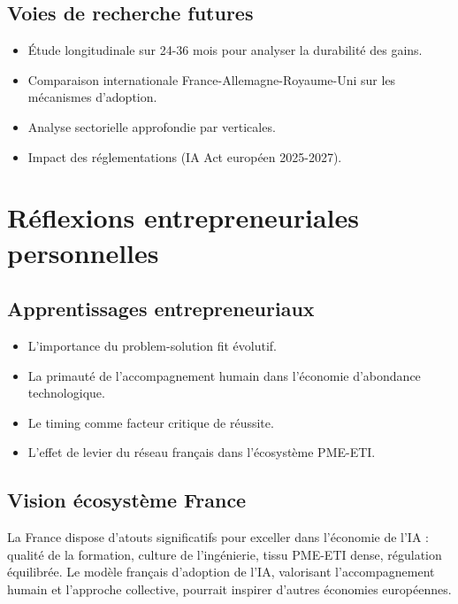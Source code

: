 \subsection{Voies de recherche futures}
\begin{itemize}
    \item Étude longitudinale sur 24-36 mois pour analyser la durabilité des gains.
    \item Comparaison internationale France-Allemagne-Royaume-Uni sur les mécanismes d'adoption.
    \item Analyse sectorielle approfondie par verticales.
    \item Impact des réglementations (IA Act européen 2025-2027).
\end{itemize}

\section{Réflexions entrepreneuriales personnelles}

\subsection{Apprentissages entrepreneuriaux}
\begin{itemize}
    \item L'importance du problem-solution fit évolutif.
    \item La primauté de l'accompagnement humain dans l'économie d'abondance technologique.
    \item Le timing comme facteur critique de réussite.
    \item L'effet de levier du réseau français dans l'écosystème PME-ETI.
\end{itemize}

\subsection{Vision écosystème France}
La France dispose d'atouts significatifs pour exceller dans l'économie de l'IA : qualité de la formation, culture de l'ingénierie, tissu PME-ETI dense, régulation équilibrée. Le modèle français d'adoption de l'IA, valorisant l'accompagnement humain et l'approche collective, pourrait inspirer d'autres économies européennes.

